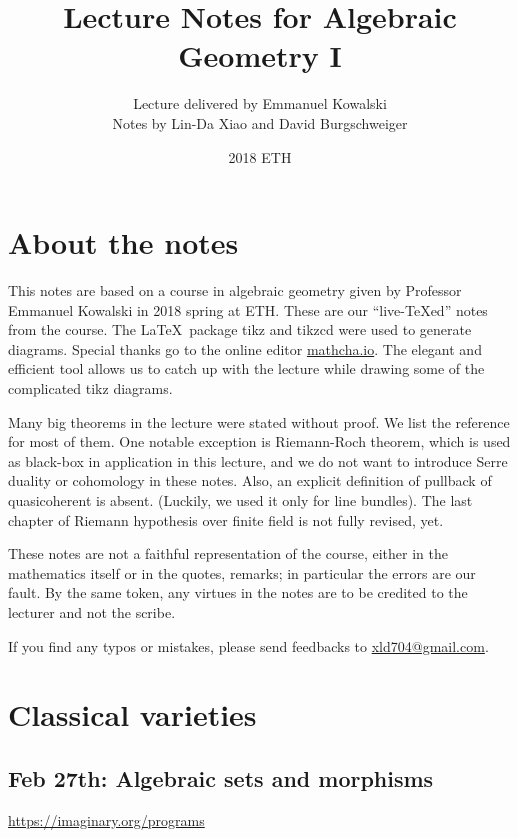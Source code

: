 \documentclass[11pt]{article}
\title{\bf Lecture Notes for Algebraic Geometry I}
\author{Lecture delivered by Emmanuel Kowalski\\
Notes by Lin-Da Xiao and David Burgschweiger}
\date{2018 ETH}
\theoremstyle{definition}
\begin{document}
\maketitle
\tableofcontents
\newpage
\section*{About the notes}
This notes are based on a course in algebraic geometry given by Professor Emmanuel Kowalski in 2018 spring at ETH.
These are our ``live-{\TeX}ed'' notes from the course. The \LaTeX\ package tikz and tikzcd were used to generate diagrams. Special thanks go to the online editor \href{https://www.mathcha.io/editor}{mathcha.io}. The elegant and efficient tool allows us to catch up with the lecture while drawing some of the complicated tikz diagrams.

Many big theorems in the lecture were stated without proof. We list the reference for most of them. One notable exception is Riemann-Roch theorem, which is used as black-box in application in this lecture, and we do not want to introduce Serre duality or cohomology in these notes. Also, an explicit definition of pullback of quasicoherent is absent. (Luckily, we used it only for line bundles). The last chapter of Riemann hypothesis over finite field is not fully revised, yet.

These notes are not a faithful representation of the course, either in the mathematics itself or in the quotes, remarks; in particular the errors are our fault. By the same token, any virtues in the notes are to be credited to the lecturer and not the scribe.

If you find any typos or mistakes, please send feedbacks to \href{mailto:xld704@gmail.com}{xld704@gmail.com}.
\newpage
\section{Classical varieties}
\subsection{Feb 27th: Algebraic sets and morphisms}
\href{https://imaginary.org/programs}{https://imaginary.org/programs}
\end{document}
